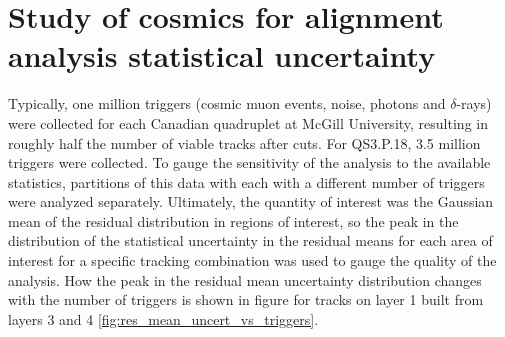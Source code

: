 
\chapter[Analysis statistics]{Study of cosmics for alignment analysis statistical uncertainty}
\label{appendix:statistics}


Typically, one million triggers (cosmic muon events, noise, photons and $\delta$-rays) were collected for each Canadian quadruplet at McGill University, resulting in roughly half the number of viable tracks after cuts. For QS3.P.18, 3.5 million triggers were collected. To gauge the sensitivity of the analysis to the available statistics, partitions of this data with each with a different number of triggers were analyzed separately. Ultimately, the quantity of interest was the Gaussian mean of the residual distribution in regions of interest, so the peak in the distribution of the statistical uncertainty in the residual means for each area of interest for a specific tracking combination was used to gauge the quality of the analysis. How the peak in the residual mean uncertainty distribution changes with the number of triggers is shown in figure for tracks on layer 1 built from layers 3 and 4 \ref{fig:res_mean_uncert_vs_triggers}. 

